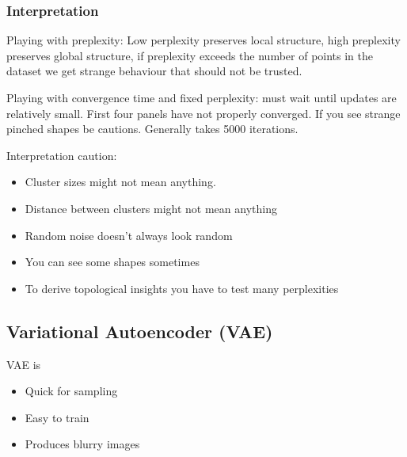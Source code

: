 \subsubsection{Interpretation}
Playing with preplexity: Low perplexity preserves local structure, high preplexity preserves global structure, if preplexity exceeds the number of points in the dataset we get strange behaviour that should not be trusted.

Playing with convergence time and fixed perplexity: must wait until updates are relatively small. First four panels have not properly converged. If you see strange pinched shapes be cautions. Generally takes 5000 iterations.


Interpretation caution:
\begin{itemize}
    \item  Cluster sizes might not mean anything.
    \item Distance between clusters might not mean anything
    \item Random noise doesn't always look random
    \item You can see some shapes sometimes
    \item To derive topological insights you have to test many perplexities
\end{itemize}

\subsection{Variational Autoencoder (VAE)}
VAE is 
\begin{itemize}
    \item Quick for sampling
    \item Easy to train
    \item Produces blurry images
\end{itemize}

